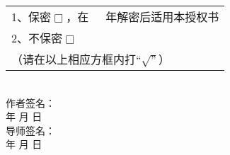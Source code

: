 \begin{tabular}[t]{l}
1、保密$ \Box$，在~~~年解密后适用本授权书  \\ 
2、不保密$ \Box$  \\ 
（请在以上相应方框内打“$\surd”$）
\end{tabular} \\
\hspace*{9.2cm}作者签名：   \\
\hspace*{10.45cm}年 \quad  月  \quad  日\\
\hspace*{9.2cm}导师签名：    \\
\hspace*{10.45cm}年 \quad  月 \quad   日\\

\thispagestyle{empty}
\clearpage

